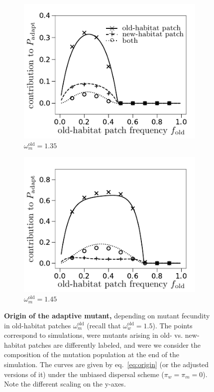 \documentclass[11pt]{article}
\begin{document}
\begin{figure}[t!]
	\centering
	\begin{subfigure}{.5\textwidth}
 		 \centering
 		 \includegraphics[width=\linewidth]{fig4a.pdf}
  		\caption{$\omega_m^{\text{old}} = 1.35$ }
	\end{subfigure}%
	\begin{subfigure}{.5\textwidth}
  		\centering
  		\includegraphics[width=\linewidth]{fig4b.pdf}
  		\caption{$\omega_m^{\text{old}} = 1.45$}
	\end{subfigure}
	\caption{\textbf{Origin of the adaptive mutant,} \small depending on mutant fecundity in old-habitat patches $\omega_m^{\text{old}}$ (recall that $\omega_{w}^{\text{old}} = 1.5$). The points correspond to simulations, were mutants arising in old- vs. new-habitat patches are differently labeled, and were we consider the composition of the mutation population at the end of the simulation. The curves are given by eq.~\eqref{eq:origin} (or the adjusted versions of it) under the unbiased dispersal scheme ($\pi_w=\pi_m=0$). Note the different scaling on the y-axes.}
	\label{fig:origin}
\end{figure}
\end{document}
